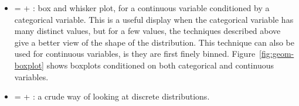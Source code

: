 \begin{itemize}
  \item {} =  + : box and whisker plot, for a continuous variable conditioned by a categorical variable.  This is a useful display when the categorical variable has many distinct values, but for a few values, the techniques described above give a better view of the shape of the distribution.  This technique can also be used for continuous variables, is they are first finely binned.   Figure~\ref{fig:geom-boxplot} shows boxplots conditioned on both categorical and continuous variables.
  
    
  
  \item {} =  + : a crude way of looking at discrete distributions.
  
    
  
  

\end{itemize}
